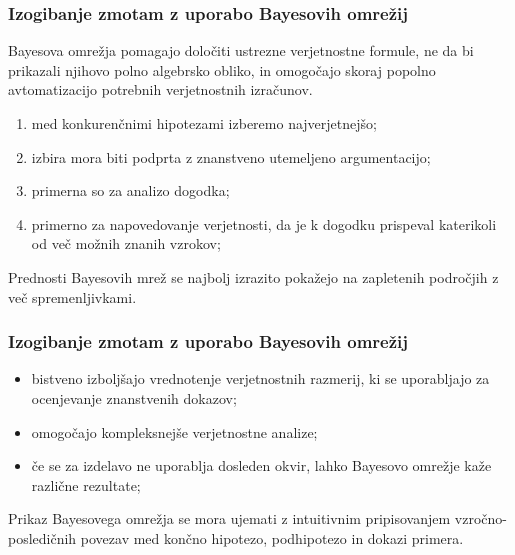 \documentclass{beamer}
\begin{document}
\begin{frame}
    \frametitle{Izogibanje zmotam z uporabo Bayesovih omrežij}
    \begin{block}{}
        Bayesova omrežja pomagajo določiti ustrezne verjetnostne formule, ne da bi prikazali njihovo polno algebrsko obliko, in omogočajo skoraj popolno avtomatizacijo potrebnih verjetnostnih izračunov.
    \end{block} \vspace{3mm}
    \begin{enumerate}
        \item med konkurenčnimi hipotezami izberemo najverjetnejšo;
        \item izbira mora biti podprta z znanstveno utemeljeno argumentacijo;
        \item primerna so za analizo dogodka;
        \item primerno za napovedovanje verjetnosti, da je k dogodku prispeval katerikoli od več možnih znanih vzrokov;
    \end{enumerate}
    \begin{block}{}
        Prednosti Bayesovih mrež se najbolj izrazito pokažejo na zapletenih področjih z več spremenljivkami.
    \end{block}
\end{frame}

\begin{frame}
    \frametitle{Izogibanje zmotam z uporabo Bayesovih omrežij}
    \begin{itemize}
        \item bistveno izboljšajo vrednotenje verjetnostnih razmerij, ki se uporabljajo za ocenjevanje znanstvenih dokazov;
        \item omogočajo kompleksnejše verjetnostne analize;
        \item če se za izdelavo ne uporablja dosleden okvir, lahko Bayesovo omrežje kaže različne rezultate;
    \end{itemize} \vspace{3mm}
    \begin{block}{}
        Prikaz Bayesovega omrežja se mora ujemati z intuitivnim pripisovanjem vzročno-posledičnih povezav med končno hipotezo, podhipotezo in dokazi primera.
    \end{block}
\end{frame}
\end{document}

